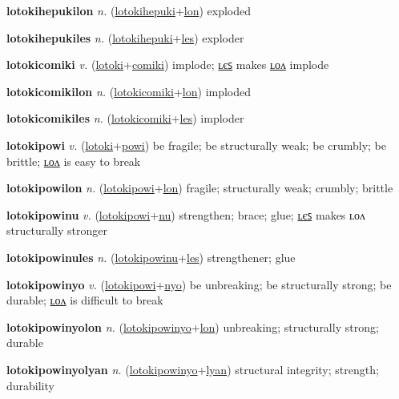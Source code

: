\textbf{\hypertarget{lotokihepukilon}{lotokihepukilon}} \textit{n.} (\hyperlink{lotokihepuki}{lotokihepuki}+\allowbreak \hyperlink{lon}{lon})
exploded

\textbf{\hypertarget{lotokihepukiles}{lotokihepukiles}} \textit{n.} (\hyperlink{lotokihepuki}{lotokihepuki}+\allowbreak \hyperlink{les}{les})
exploder

\textbf{\hypertarget{lotokicomiki}{lotokicomiki}} \textit{v.} (\hyperlink{lotoki}{lotoki}+\allowbreak \hyperlink{comiki}{comiki})
implode; \hyperlink{lotokicomikiles}{ʟєꜱ} makes \hyperlink{lotokicomikilon}{ʟᴏᴧ} implode

\textbf{\hypertarget{lotokicomikilon}{lotokicomikilon}} \textit{n.} (\hyperlink{lotokicomiki}{lotokicomiki}+\allowbreak \hyperlink{lon}{lon})
imploded

\textbf{\hypertarget{lotokicomikiles}{lotokicomikiles}} \textit{n.} (\hyperlink{lotokicomiki}{lotokicomiki}+\allowbreak \hyperlink{les}{les})
imploder

\textbf{\hypertarget{lotokipowi}{lotokipowi}} \textit{v.} (\hyperlink{lotoki}{lotoki}+\allowbreak \hyperlink{powi}{powi})
be fragile; be structurally weak; be crumbly; be brittle; \hyperlink{lotokipowilon}{ʟᴏᴧ} is easy to break

\textbf{\hypertarget{lotokipowilon}{lotokipowilon}} \textit{n.} (\hyperlink{lotokipowi}{lotokipowi}+\allowbreak \hyperlink{lon}{lon})
fragile; structurally weak; crumbly; brittle

\textbf{\hypertarget{lotokipowinu}{lotokipowinu}} \textit{v.} (\hyperlink{lotokipowi}{lotokipowi}+\allowbreak \hyperlink{nu}{nu})
strengthen; brace; glue; \hyperlink{lotokipowinules}{ʟєꜱ} makes ʟᴏᴧ structurally stronger

\textbf{\hypertarget{lotokipowinules}{lotokipowinules}} \textit{n.} (\hyperlink{lotokipowinu}{lotokipowinu}+\allowbreak \hyperlink{les}{les})
strengthener; glue

\textbf{\hypertarget{lotokipowinyo}{lotokipowinyo}} \textit{v.} (\hyperlink{lotokipowi}{lotokipowi}+\allowbreak \hyperlink{nyo}{nyo})
be unbreaking; be structurally strong; be durable; \hyperlink{lotokipowinyolon}{ʟᴏᴧ} is difficult to break

\textbf{\hypertarget{lotokipowinyolon}{lotokipowinyolon}} \textit{n.} (\hyperlink{lotokipowinyo}{lotokipowinyo}+\allowbreak \hyperlink{lon}{lon})
unbreaking; structurally strong; durable

\textbf{\hypertarget{lotokipowinyolyan}{lotokipowinyolyan}} \textit{n.} (\hyperlink{lotokipowinyo}{lotokipowinyo}+\allowbreak \hyperlink{lyan}{lyan})
structural integrity; strength; durability

